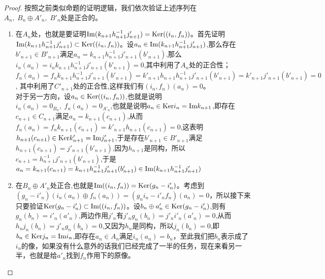 \begin{proof}
按照之前类似命题的证明逻辑，我们依次验证上述序列在$A_{n},\;B_{n}\oplus A'_{n},\;B'_{n}$处是正合的。
\begin{enumerate}
    \item 在$A_{n}$处，也就是要证明${\rm Im}(k_{n+1}h_{n+1}^{-1}j'_{n+1})={\rm Ker}((i_{n},f_{n}))$。首先证明${\rm Im}(k_{n+1}h_{n+1}^{-1}j'_{n+1})\subset{\rm Ker}((i_{n},f_{n}))$。设$a_{n}\in {\rm Im}(k_{n+1}h_{n+1}^{-1}j'_{n+1})$,那么存在$b'_{n+1}\in  B'_{n+1}$满足$a_{n}=k_{n+1}h_{n+1}^{-1}j'_{n+1}(b'_{n+1})$,那么$i_{n}(a_{n})=i_{n}k_{n+1}h_{n+1}^{-1}j'_{n+1}(b'_{n+1})=0$,其中利用了$A_{n}$处的正合性；$f_{n}(a_{n})=f_{n}k_{n+1}h_{n+1}^{-1}j'_{n+1}(b'_{n+1})=k'_{n+1}h_{n+1}h_{n+1}^{-1}j'_{n+1}(b'_{n+1})=k'_{n+1}j'_{n+1}(b'_{n+1})=0$, 其中利用了$C'_{n+1}$处的正合性,这样我们有$(i_{n},f_{n})(a_{n})=0$。\\
    对于另一方向，设$a_{n}\in {\rm Ker}((i_{n},f_{n}))$,也就是说明$i_{n}(a_{n})=0_{B_{n}},\;f_{n}(a_{n})=0_{A'_{n}}$,也就是说明$a_{n}\in{\rm Ker} i_{n}={\rm Im} k_{n+1}$,即存在$c_{n+1}\in C_{n+1}$满足$a_{n}=k_{n+1}(c_{n+1})$,从而$f_{n}(a_{n})=f_{n}k_{n+1}(c_{n+1})=k'_{n+1}h_{n+1}(c_{n+1})=0$,这表明$h_{n+1}(c_{n+1})\in{\rm Ker} k'_{n+1}={\rm Im} j'_{n+1}$,于是存在$b'_{n+1}\in B'_{n+1}$满足$h_{n+1}(c_{n+1})=j'_{n+1}(b'_{n+1})$,因为$h_{n+1}$是同构，所以$c_{n+1}=h_{n+1}^{-1}j'_{n+1}(b'_{n+1})$,于是$a_{n}=k_{n+1}(c_{n+1})=k_{n+1}h_{n+1}^{-1}j'_{n+1}(b'_{n+1})\in {\rm Im}(k_{n+1}h_{n+1}^{-1}j'_{n+1})$
    \item 在$B_{n}\oplus A'_{n}$处正合,也就是${\rm Im}((i_{n},f_{n}))={\rm Ker} (g_{n}-i'_{n})$。考虑到$(g_{n}-i'_{n})(i_{n}(a_{n})\oplus f_{n}(a_{n}))=(g_{n}i_{n}-i'_{n}f_{n})(a_{n})=0$，所以接下来只要验证${\rm Ker} (g_{n}-i'_{n})\subset {\rm Im}((i_{n},f_{n}))$。设$b_{n}\oplus a'_{n}\in {\rm Ker} (g_{n}-i'_{n}) $,则有$g_{n}(b_{n})=i'_{n}(a'_{n})$,两边作用$j'_{n}$有$j'_{n}g_{n}(b_{n})=j'_{n}i'_{n}(a'_{n})=0$,从而$h_{n}j_{n}(b_{n})=j'_{n}g_{n}(b_{n})=0$,又因为$h_{n}$是同构，所以$j_{n}(b_{n})=0$,即$b_{n}\in{\rm Ker} j_{n}={\rm Im} i_{n}$,即存在$a_{n}\in A_{n}$满足$i_{n}(a_{n})=b_{n}$，至此我们把$b_{n}$表示成了$i_{n}$的像，如果没有什么意外的话我们已经完成了一半的任务，现在来看另一半，也就是给$a'_{n}$找到$f_{n}$作用下的原像。
    

\end{enumerate}
\end{proof}
